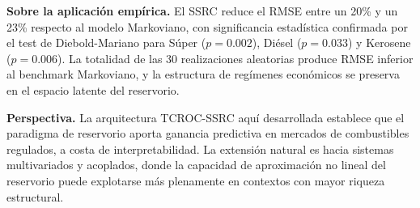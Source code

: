 \textbf{Sobre la aplicación empírica.}  El SSRC reduce el RMSE entre
un 20\% y un 23\% respecto al modelo Markoviano, con significancia
estadística confirmada por el test de Diebold-Mariano para Súper
($p = 0.002$), Diésel ($p = 0.033$) y Kerosene ($p = 0.006$).  La
totalidad de las 30 realizaciones aleatorias produce RMSE inferior al
benchmark Markoviano, y la estructura de regímenes económicos se
preserva en el espacio latente del reservorio.

\textbf{Perspectiva.}  La arquitectura TCROC-SSRC aquí desarrollada
establece que el paradigma de reservorio aporta ganancia predictiva
en mercados de combustibles regulados, a costa de interpretabilidad.
La extensión natural es hacia sistemas multivariados y acoplados,
donde la capacidad de aproximación no lineal del reservorio puede
explotarse más plenamente en contextos con mayor riqueza estructural.

